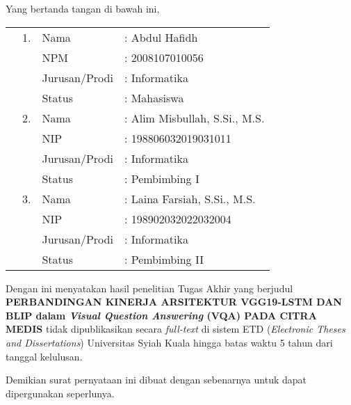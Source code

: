 \spernyataan %

\noindent
Yang bertanda tangan di bawah ini,
\vspace{-0.1cm}
\begin{table}[H]
{\renewcommand{\arraystretch}{0.7}
\begin{tabular}{M{0.6cm}lll}
	&1. 	& Nama   		&: Abdul Hafidh \\
	&	& NPM       			&: 2008107010056   \\
	&	& Jurusan/Prodi   		&: Informatika \\
	&	& Status 				&: Mahasiswa \\  
	&2. 	& Nama  		&: Alim Misbullah, S.Si., M.S. \\
	&	& NIP       			&: 198806032019031011    \\
	&	& Jurusan/Prodi   		&: Informatika \\
	&	& Status 				&: Pembimbing I \\  
	&3. 	& Nama  		&: Laina Farsiah, S.Si., M.S. \\
	&	& NIP       			&: 198902032022032004  \\
	&	& Jurusan/Prodi   		&: Informatika \\
	&	& Status 				&: Pembimbing II   
\end{tabular}
}
\end{table}
\vspace{-0.4cm}
\noindent
Dengan ini menyatakan hasil penelitian Tugas Akhir yang berjudul \textbf{PERBANDINGAN KINERJA ARSITEKTUR VGG19-LSTM DAN BLIP dalam \textit{Visual Question Answering} (VQA) PADA CITRA MEDIS} tidak dipublikasikan secara \textit{full-text} di sistem ETD (\textit{Electronic Theses and Dissertations}) Universitas Syiah Kuala hingga batas waktu 5 tahun dari tanggal kelulusan.

\vspace{0.4cm}
\noindent
Demikian surat pernyataan ini dibuat dengan sebenarnya untuk dapat dipergunakan seperlunya.


